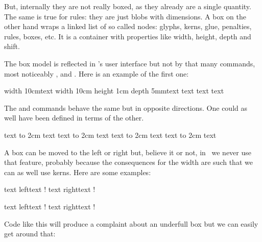 But, internally they are not really boxed, as they already are a single quantity.
The same is true for rules: they are just blobs with dimensions. A box on the
other hand wraps a linked list of so called nodes: glyphs, kerns, glue,
penalties, rules, boxes, etc. It is a container with properties like width,
height, depth and shift.

\stopsection

\stopsection

\startsection[title={\TEX\ primitives}]

The box model is reflected in \TEX's user interface but not by that many
commands, most noticeably \type {\hbox}, \type {\vbox} and \type {\vtop}. Here is
an example of the first one:

\starttyping[option=TEX]
\hbox width 10cm{text}
\hbox width 10cm height 1cm depth 5mm{text}
text \hbox{text} text
\stoptyping

The \type {\raise} and \type {\lower} commands behave the same but in opposite
directions. One could as well have been defined in terms of the other.

\startbuffer
text \raise  5mm \hbox to 2cm {text}
text \lower -5mm \hbox to 2cm {text}
text \raise -5mm \hbox to 2cm {text}
text \lower  5mm \hbox to 2cm {text}
\stopbuffer

\typebuffer[option=TEX]

\startlinecorrection
{\dontcomplain\showboxes\getbuffer}
\stoplinecorrection

A box can be moved to the left or right but, believe it or not, in \CONTEXT\ we
never use that feature, probably because the consequences for the width are such
that we can as well use kerns. Here are some examples:

\startbuffer
text \vbox{\moveleft  5mm \hbox {left}}text !
text \vbox{\moveright 5mm \hbox{right}}text !
\stopbuffer

\typebuffer[option=TEX]

\startlinecorrection
{\dontcomplain\getbuffer}
\stoplinecorrection

\startbuffer
text \vbox{\moveleft  25mm \hbox {left}}text !
text \vbox{\moveright 25mm \hbox{right}}text !
\stopbuffer

\typebuffer[option=TEX]

\startlinecorrection
{\dontcomplain\getbuffer}
\stoplinecorrection

Code like this will produce a complaint about an underfull box but we can easily
get around that:

